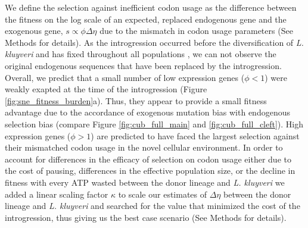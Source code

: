 \documentclass[doublespacing,linenumbers]{bmcart-modified}
\newcommand{\kluyveri}{\textit{L. kluyveri}\xspace}
\newcommand{\DE}{\ensuremath{{\Delta \eta}}\xspace}
\begin{document}
We define the selection against inefficient codon usage as the difference between the fitness on the log scale of an expected, replaced endogenous gene and the exogenous gene, $s \propto \phi \DE$ due to the mismatch in codon usage parameters (See Methods for details).
As the introgression occurred before the diversification of \kluyveri and has fixed throughout all populations \citep{friedrich2015}, we can not observe the original endogenous sequences that have been replaced by the introgression.
Overall, we predict that a small number of low expression genes ($\phi < 1$) were weakly exapted at the time of the introgression (Figure \ref{fig:sne_fitness_burden}a).
Thus, they appear to provide a small fitness advantage due to the accordance of exogenous mutation bias with endogenous selection bias (compare Figure \ref{fig:cub_full_main} and \ref{fig:cub_full_cleft}).
High expression genes ($\phi > 1$) are predicted to have faced the largest selection against their mismatched codon usage in the novel cellular environment.
In order to account for differences in the efficacy of selection on codon usage either due to the cost of pausing, differences in the effective population size, or the decline in fitness with every ATP wasted between the donor lineage and \kluyveri we added a linear scaling factor $\kappa$ to scale our estimates of \DE between the donor lineage and \kluyveri and searched for the value that minimized the cost of the introgression, thus giving us the best case scenario (See Methods for details).
\end{document}
